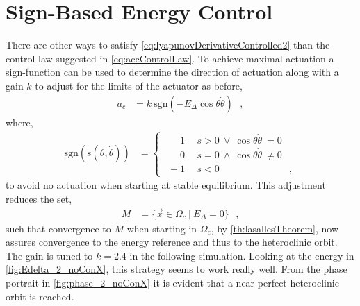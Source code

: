 \section{Sign-Based Energy Control}
There are other ways to satisfy \autoref{eq:lyapunovDerivativeControlled2} than the control law suggested in \autoref{eq:accControlLaw}. To achieve maximal actuation a sign-function can be used to determine the direction of actuation along with a gain $k$ to adjust for the limits of the actuator as before,
\begin{align}
  a_c &= k\ \mathrm{sgn}(-E_\Delta \cos \theta \dot{\theta})  \ \ \ ,  \label{eq:accControlLaw2} 
\end{align}
where,
\begin{align}
\text{sgn}( s(\theta,\dot{\theta}) ) &=
\begin{cases}
\ \ \phantom{-} 1  & \ \ s  > 0 \ \lor   \ \cos \theta \dot{\theta} \ =    0 \\
\ \ \phantom{-} 0  & \ \ s  = 0 \ \land  \ \cos \theta \dot{\theta} \ \neq 0 \\
\ \            -1  & \ \ s  < 0 \hspace{3cm} ,
\end{cases}
\label{eq:sgnFunction}
\end{align}
to avoid no actuation when starting at stable equilibrium. This adjustment reduces the set,
\begin{align}
  M  &= \{ \vec{x} \in \Omega_c \ | \ E_\Delta = 0 \}  \ \ \ ,  \label{eq:M2}
\end{align}
such that convergence to $M$ when starting in $\Omega_c$, by \autoref{th:lasallesTheorem}, now assures convergence to the energy reference and thus to the heteroclinic orbit.\\
The gain is tuned to $k = 2.4$ in the following simulation. Looking at the energy in \autoref{fig:Edelta_2_noConX}, this strategy seems to work really well. From the phase portrait in \autoref{fig:phase_2_noConX} it is evident that a near perfect heteroclinic orbit is reached.
